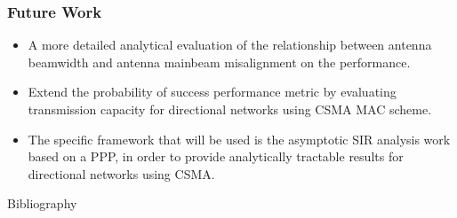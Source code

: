 \documentclass{beamer}
\begin{document}
\begin{frame}
\frametitle{\color{WPI_red} Future Work}
\begin{itemize}

\item A more detailed analytical evaluation of the relationship between antenna beamwidth and antenna mainbeam misalignment on the performance.

\item Extend the probability of success performance metric by evaluating transmission capacity for directional networks using CSMA MAC scheme.

\item The specific framework that will be used is the asymptotic SIR analysis work based on a PPP, in order to provide analytically tractable results for directional networks using CSMA.
\end{itemize}

\end{frame}

\begin{frame}{Bibliography}

\end{frame}
\end{document}
